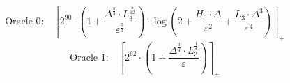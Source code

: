 \[\text{Oracle 0:}\quad \left\lceil 2^{90} \cdot \left(1 + \frac{\Delta^{\frac{5}{4}} \cdot L_3^{\frac{5}{12}}}{\varepsilon^{\frac{5}{3}}}\right) \cdot \log\left(2 + \frac{H_0 \cdot \Delta}{\varepsilon^{2}} + \frac{L_3 \cdot \Delta^{3}}{\varepsilon^{4}}\right) \right\rceil_{+}\]
\[\text{Oracle 1:}\quad \left\lceil 2^{62} \cdot \left(1 + \frac{\Delta^{\frac{3}{4}} \cdot L_3^{\frac{1}{4}}}{\varepsilon}\right) \right\rceil_{+}\]

